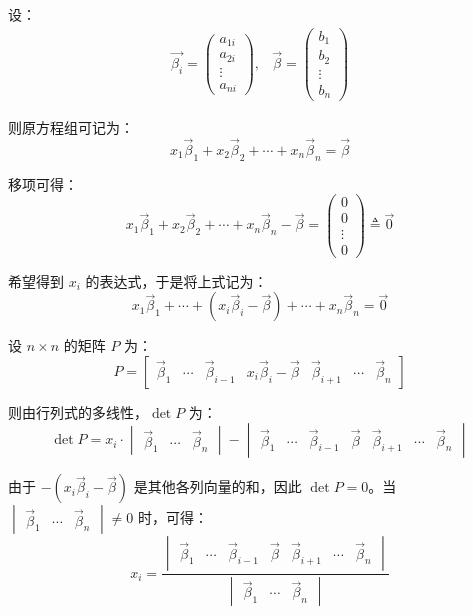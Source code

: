 设：
$$
\begin{matrix}
	\vec{\beta_i} = \begin{pmatrix} a_{1i} \\ a_{2i} \\ \vdots \\ a_{ni} \end{pmatrix},
	&
	\vec{\beta} = \begin{pmatrix} b_1 \\ b_2 \\ \vdots \\ b_n \end{pmatrix}
\end{matrix}
$$

则原方程组可记为：
$$
x_1 \vec \beta_1 + x_2 \vec \beta_2 + \cdots + x_n \vec \beta_n = \vec \beta
$$

移项可得：
$$
x_1 \vec \beta_1 + x_2 \vec \beta_2 + \cdots + x_n \vec \beta_n - \vec \beta =
\begin{pmatrix} 0 \\ 0 \\ \vdots \\ 0 \end{pmatrix}
\triangleq \vec 0
$$

希望得到 $x_i$ 的表达式，于是将上式记为：
$$
x_1 \vec \beta_1 + \cdots + (x_i \vec \beta_i - \vec \beta) + \cdots + x_n \vec \beta_n = \vec 0
$$

设 $n \times n$ 的矩阵 $P$ 为：
$$
P =
\begin{bmatrix} \vec \beta_1 & \cdots & \vec \beta_{i - 1} & x_i \vec \beta_i - \vec \beta & \vec \beta_{i + 1} & \cdots & \vec \beta_n \end{bmatrix}
$$

则由行列式的多线性，$\det P$ 为：
$$
\det P = x_i \cdot
\begin{vmatrix} \vec \beta_1 & \cdots & \vec \beta_n \end{vmatrix}
-
\begin{vmatrix} \vec \beta_1 & \cdots & \vec \beta_{i - 1} & \vec \beta & \vec \beta_{i + 1} & \cdots & \vec \beta_n \end{vmatrix}
$$

由于 $-(x_i \vec \beta_i - \vec \beta)$ 是其他各列向量的和，因此 $\det P = 0$。当 $\begin{vmatrix} \vec \beta_1 & \cdots & \vec \beta_n \end{vmatrix} \ne 0$ 时，可得：
$$
x_i = \dfrac{\begin{vmatrix} \vec \beta_1 & \cdots & \vec \beta_{i - 1} &\vec \beta & \vec \beta_{i + 1} & \cdots & \vec \beta_n \end{vmatrix}}{\begin{vmatrix} \vec \beta_1 & \cdots & \vec \beta_n \end{vmatrix}}
$$

